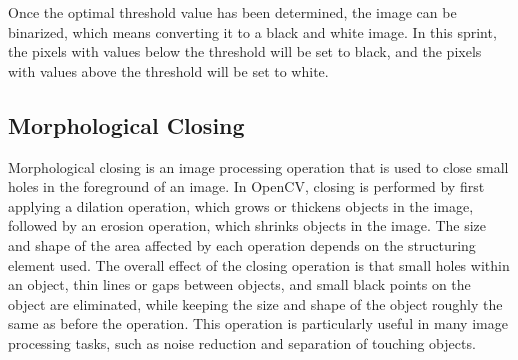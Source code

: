 Once the optimal threshold value has been determined, the image can be binarized, which means converting it to a black and white image. In this sprint, the pixels with values below the threshold will be set to black, and the pixels with values above the threshold will be set to white.

\newpage

\subsection{Morphological Closing}

Morphological closing is an image processing operation that is used to close small holes in the foreground of an image. In OpenCV, closing is performed by first applying a dilation operation, which grows or thickens objects in the image, followed by an erosion operation, which shrinks objects in the image. The size and shape of the area affected by each operation depends on the structuring element used. The overall effect of the closing operation is that small holes within an object, thin lines or gaps between objects, and small black points on the object are eliminated, while keeping the size and shape of the object roughly the same as before the operation. This operation is particularly useful in many image processing tasks, such as noise reduction and separation of touching objects. \cite{haralickImageAnalysisUsing1987}

